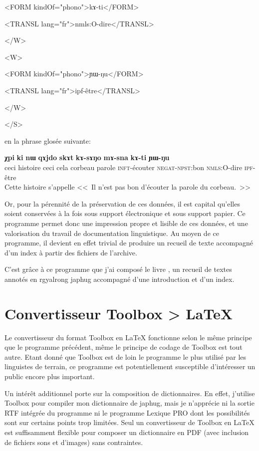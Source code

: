 \documentclass[oldfontcommands,oneside,a4paper,11pt]{memoir}
\newcommand{\ipa}[1]{{\phon\textbf{#1}}}
\begin{document}
      <FORM kindOf="phono">kɤ-ti</FORM>


      <TRANSL lang="fr">nmls:O-dire</TRANSL>


    </W>


    <W>


      <FORM kindOf="phono">ɲɯ-ŋu</FORM>


      <TRANSL lang="fr">ipf-être</TRANSL>


    </W>


  </S>
 
 
 
en  la phrase glosée suivante:

\begin{exe} 
 \ex 
\gll \ipa{kɯki} \ipa{χpi} \ipa{ki} \ipa{nɯ} \ipa{qɤjdo} \ipa{skɤt} \ipa{kɤ-sɤŋo} \ipa{mɤ-sna} \ipa{kɤ-ti} \ipa{ɲɯ-ŋu}\\ 
ceci histoire ceci cela corbeau parole \textsc{inft}-écouter \textsc{negat}-\textsc{npst}:bon \textsc{nmls}:O-dire \textsc{ipf}-être\\ 
 \glt Cette histoire s'appelle <<~Il n'est pas bon d'écouter la parole du corbeau.~>>
\end{exe} 
 
 
Or, pour la pérennité de la préservation de ces données, il est capital qu'elles soient conservées à la fois sous support électronique et sous support papier. Ce programme permet donc une impression propre et lisible de ces données, et une valorisation du travail de documentation linguistique. Au moyen de ce programme, il devient en effet trivial de produire un recueil de texte accompagné d'un index à partir des fichiers de l'archive.

C'est grâce à ce programme que j'ai composé le livre \citet{jacques10gesar}, un recueil de textes annotés en rgyalrong japhug accompagné d'une introduction et d'un index.





\section{Convertisseur Toolbox > \LaTeX}
Le convertisseur du format Toolbox en \LaTeX{} fonctionne selon le même principe que le programme précédent, même le principe de codage de Toolbox est tout autre. Etant donné que Toolbox est de loin le programme le plus utilisé par les linguistes de terrain, ce programme est potentiellement susceptible d'intéresser un public encore plus important.

Un intérêt additionnel porte sur la composition de dictionnaires. En effet, j'utilise Toolbox pour compiler mon dictionnaire de japhug, mais je n'apprécie ni la sortie RTF intégrée du programme ni le programme Lexique PRO dont les possibilités sont sur certains points trop limitées. Seul un convertisseur de Toolbox en \LaTeX{} est suffisamment flexible pour composer un dictionnaire en PDF (avec inclusion de fichiers sons et d'images) sans contraintes.
\end{document}
